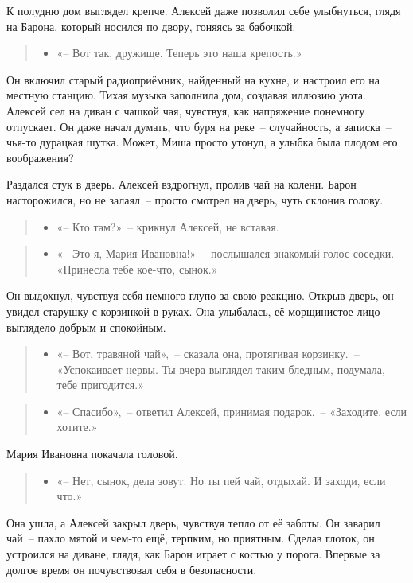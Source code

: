\documentclass[12pt,a4paper]{book}
\newenvironment{dialogue}{\begin{quote}\itshape\begin{itemize}\item[]}{\end{itemize}\end{quote}}
\begin{document}
К полудню дом выглядел крепче. Алексей даже позволил себе улыбнуться, глядя на Барона, который носился по двору, гоняясь за бабочкой.

\begin{dialogue}
«-- Вот так, дружище. Теперь это наша крепость.»
\end{dialogue}

Он включил старый радиоприёмник, найденный на кухне, и настроил его на местную станцию. Тихая музыка заполнила дом, создавая иллюзию уюта. Алексей сел на диван с чашкой чая, чувствуя, как напряжение понемногу отпускает. Он даже начал думать, что буря на реке~-- случайность, а записка~-- чья-то дурацкая шутка. Может, Миша просто утонул, а улыбка была плодом его воображения?

Раздался стук в дверь. Алексей вздрогнул, пролив чай на колени. Барон насторожился, но не залаял~-- просто смотрел на дверь, чуть склонив голову.

\begin{dialogue}
«-- Кто там?»~-- крикнул Алексей, не вставая.
\end{dialogue}

\begin{dialogue}
«-- Это я, Мария Ивановна!»~-- послышался знакомый голос соседки.~-- «Принесла тебе кое-что, сынок.»
\end{dialogue}

Он выдохнул, чувствуя себя немного глупо за свою реакцию. Открыв дверь, он увидел старушку с корзинкой в руках. Она улыбалась, её морщинистое лицо выглядело добрым и спокойным.

\begin{dialogue}
«-- Вот, травяной чай»,~-- сказала она, протягивая корзинку.~-- «Успокаивает нервы. Ты вчера выглядел таким бледным, подумала, тебе пригодится.»
\end{dialogue}

\begin{dialogue}
«-- Спасибо»,~-- ответил Алексей, принимая подарок.~-- «Заходите, если хотите.»
\end{dialogue}

Мария Ивановна покачала головой.

\begin{dialogue}
«-- Нет, сынок, дела зовут. Но ты пей чай, отдыхай. И заходи, если что.»
\end{dialogue}

Она ушла, а Алексей закрыл дверь, чувствуя тепло от её заботы. Он заварил чай~-- пахло мятой и чем-то ещё, терпким, но приятным. Сделав глоток, он устроился на диване, глядя, как Барон играет с костью у порога. Впервые за долгое время он почувствовал себя в безопасности.
\end{document}
